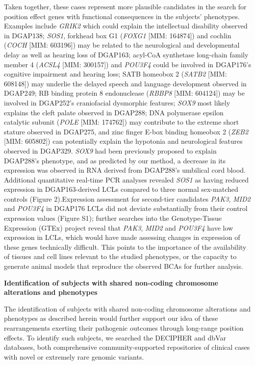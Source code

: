 \documentclass[a4paper,twoside=true,openright,parskip=full,chapterprefix=true,11pt,headings=normal,bibliography=totoc,listof=totoc,titlepage=on,captions=tableabove,draft=false]{scrreprt}
\theoremstyle{definition}
\theoremstyle{definition}
\theoremstyle{definition}
\theoremstyle{remark}
\begin{document}
Taken together, these cases represent more plausible candidates in the
search for position effect genes with functional consequences in the
subjects' phenotypes. Examples include \emph{GRIK2} which could explain
the intellectual disability observed in DGAP138; \emph{SOS1}, forkhead
box G1 (\emph{FOXG1} {[}MIM: 164874{]}) and cochlin (\emph{COCH} {[}MIM:
603196{]}) may be related to the neurological and developmental delay as
well as hearing loss of DGAP163; acyl-CoA synthetase long-chain family
member 4 (\emph{ACSL4} {[}MIM: 300157{]}) and \emph{POU3F4} could be
involved in DGAP176's cognitive impairment and hearing loss; SATB
homeobox 2 (\emph{SATB2} {[}MIM: 608148{]}) may underlie the delayed
speech and language development observed in DGAP249; RB binding protein
8 endonuclease (\emph{RBBP8} {[}MIM: 604124{]}) may be involved in
DGAP252's craniofacial dysmorphic features; \emph{SOX9} most likely
explains the cleft palate observed in DGAP288; DNA polymerase epsilon
catalytic subunit (\emph{POLE} {[}MIM: 174762{]}) may contribute to the
extreme short stature observed in DGAP275, and zinc finger E-box binding
homeobox 2 (\emph{ZEB2} {[}MIM: 605802{]}) can potentially explain the
hypotonia and neurological features observed in DGAP329. \emph{SOX9} had
been previously proposed to explain DGAP288's phenotype, and as
predicted by our method, a decrease in its expression was observed in
RNA derived from DGAP288's umbilical cord blood.\citep{Ordulu2016}
Additional quantitative real-time PCR analyses revealed \emph{SOS1} as
having reduced expression in DGAP163-derived LCLs compared to three
normal sex-matched controls (Figure 2).Expression assessment for
second-tier candidates \emph{PAK3}, \emph{MID2} and \emph{POU3F4} in
DGAP176 LCLs did not deviate substantially from their control expression
values (Figure S1); further searches into the Genotype-Tissue Expression
(GTEx) project\citep{Lonsdale2013} reveal that \emph{PAK3}, \emph{MID2}
and \emph{POU3F4} have low expression in LCLs, which would have made
assessing changes in expression of these genes technically difficult.
This points to the importance of the availability of tissues and cell
lines relevant to the studied phenotypes, or the capacity to generate
animal models that reproduce the observed BCAs for further analysis.

\textbf{Identification of subjects with shared non-coding chromosome
alterations and phenotypes}

The identification of subjects with shared non-coding chromosome
alterations and phenotypes as described herein would further support our
idea of these rearrangements exerting their pathogenic outcomes through
long-range position effects. To identify such subjects, we searched the
DECIPHER\citep{Firth2009} and dbVar databases,\citep{Lappalainen2013}
both comprehensive community-supported repositories of clinical cases
with novel or extremely rare genomic variants.
\end{document}
